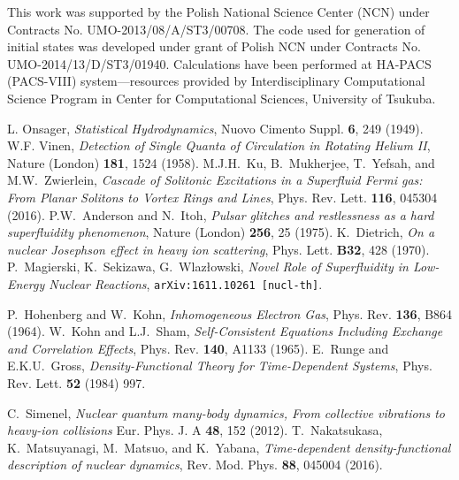 \documentclass{PoS}
\begin{document}
\begin{acknowledgments}
This work was supported by the Polish National Science Center (NCN)
under Contracts No. UMO-2013/08/A/ST3/00708. The code used for
generation of initial states was developed under grant of Polish NCN
under Contracts No. UMO-2014/13/D/ST3/01940. Calculations have
been performed at HA-PACS (PACS-VIII) system---resources provided
by Interdisciplinary Computational Science Program in Center for
Computational Sciences, University of Tsukuba.
\end{acknowledgments}

\begin{thebibliography}{99}
L. Onsager, \emph{Statistical Hydrodynamics}, Nuovo Cimento Suppl. \textbf{6}, 249 (1949).
W.F. Vinen, \emph{Detection of Single Quanta of Circulation in Rotating Helium II},
Nature (London) \textbf{181}, 1524 (1958).
M.J.H.~Ku, B.~Mukherjee, T.~Yefsah, and M.W.~Zwierlein,
\emph{Cascade of Solitonic Excitations in a Superfluid Fermi gas: From Planar Solitons to Vortex Rings and Lines},
Phys. Rev. Lett. \textbf{116}, 045304 (2016).
P.W.~Anderson and N.~Itoh,
\emph{Pulsar glitches and restlessness as a hard superfluidity phenomenon},
Nature (London) \textbf{256}, 25 (1975).
K.~Dietrich, \emph{On a nuclear Josephson effect in heavy ion scattering},
Phys. Lett. \textbf{B32}, 428 (1970).
P.~Magierski, K.~Sekizawa, G.~Wlaz{\l}owski,
\emph{Novel Role of Superfluidity in Low-Energy Nuclear Reactions},
{\tt arXiv:1611.10261 [nucl-th]}.

P.~Hohenberg and W.~Kohn, \emph{Inhomogeneous Electron Gas}, Phys. Rev. \textbf{136}, B864 (1964).
W.~Kohn and L.J.~Sham, \emph{Self-Consistent Equations Including Exchange and Correlation Effects},
Phys. Rev. \textbf{140}, A1133 (1965).
E.~Runge and E.K.U.~Gross,
\emph{Density-Functional Theory for Time-Dependent Systems},
Phys. Rev. Lett. \textbf{52} (1984) 997.

C.~Simenel, \emph{Nuclear quantum many-body dynamics, From collective vibrations to heavy-ion collisions}
Eur. Phys. J. A \textbf{48}, 152 (2012).
T.~Nakatsukasa, K.~Matsuyanagi, M.~Matsuo, and K.~Yabana,
\emph{Time-dependent density-functional description of nuclear dynamics},
Rev. Mod. Phys. \textbf{88}, 045004 (2016).


\end{thebibliography}
\end{document}
